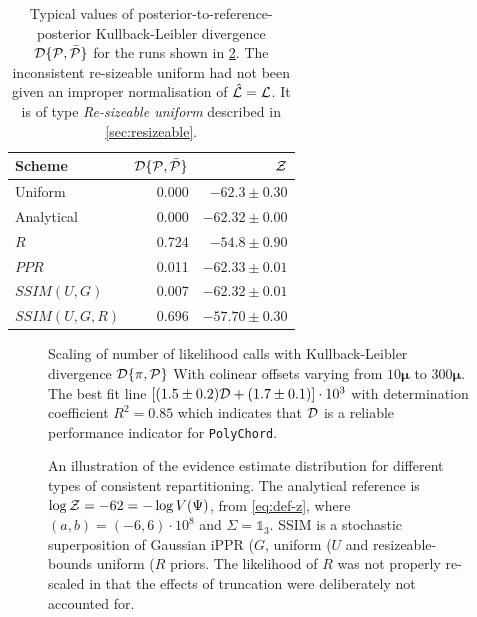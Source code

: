 \documentclass[usenatbib]{mnras}
\begin{document}
\begin{table}
  \centering
  
  \caption{Typical values of posterior-to-reference-posterior
    Kullback-Leibler divergence ${\cal D}\{{\cal P}, \bar{\cal P}\}$
    for the runs shown in \cref{fig:hist}. The inconsistent
    re-sizeable uniform had not been given an improper normalisation
    of $\hat{\cal L} = {\cal L}$. It is of type \emph{Re-sizeable
      uniform} described in \cref{sec:resizeable}.}
  \begin{tabular}{lrr}
    \textbf{Scheme} & ${\cal D}\{ {\cal P}, \bar{\cal P}\}$ & ${\cal Z}$\\
    \hline
    Uniform & 0.000 & \(-62.3 \pm 0.30\)\\
    Analytical & 0.000 & \(-62.32 \pm 0.00\) \\
    $R$ & 0.724 & \(-54.8 \pm 0.90\)\\
    $PPR$ & 0.011 & \(-62.33 \pm 0.01\)\\
    $SSIM(U, G)$ & 0.007 & \(-62.32 \pm 0.01\)\\
    $SSIM(U, G, R)$ & 0.696 & \(-57.70 \pm 0.30\)\\
  \end{tabular}
  \label{tab:hist}
\end{table}


\begin{figure}
  
  \caption{Scaling of number of likelihood calls with Kullback-Leibler
    divergence \({\cal D}\{ \pi, {\cal P}\}\) With colinear offsets
    varying from $10\bm{\mu}$ to $300\bm{\mu}$. The best fit line
    \(\left[(1.5 \pm 0.2) {\cal D} + (1.7 \pm 0.1)\right]\cdot 10^3 \)
    with determination coefficient \(R^{2} = 0.85\) which indicates
    that \({\cal D}\) is a reliable performance indicator for
    \texttt{PolyChord}.\label{fig:kl-scaling}}
\end{figure}


\begin{figure}

\caption{An illustration of the evidence estimate distribution for
  different types of consistent repartitioning. The analytical
  reference is \(\log {\cal Z} = -62 = - \log V(\Psi)\), from
  \cref{eq:def-z}, where \((a,b)=(-6, 6)\cdot 10^{8}\) and
  \(\Sigma=\mathds{1}_{3}\). SSIM is a stochastic superposition of
  Gaussian iPPR (\(G\), uniform (\(U\) and resizeable-bounds uniform
  (\(R\) priors. The likelihood of \(R\) was not properly re-scaled in
  that the effects of truncation were deliberately not accounted for.
  \label{fig:hist}}
\end{figure}
\end{document}
